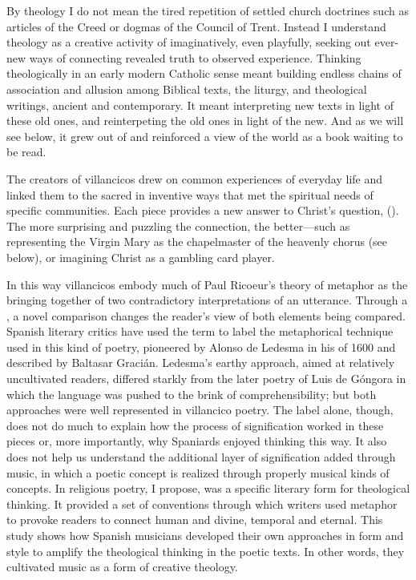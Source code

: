 By theology I do not mean the tired repetition of settled church doctrines such
as articles of the Creed or dogmas of the Council of Trent.
Instead I understand theology as a creative activity of imaginatively, even
playfully, seeking out ever-new ways of connecting revealed truth to observed
experience.
Thinking theologically in an early modern Catholic sense meant building 
endless chains of association and allusion among Biblical texts, the liturgy,
and theological writings, ancient and contemporary.
It meant interpreting new texts in light of these old ones, and reinterpeting
the old ones in light of the new.
And as we will see below, it grew out of and reinforced a view of the world as
a book waiting to be read.

The creators of villancicos drew on common experiences of everyday life and
linked them to the sacred in inventive ways that met the spiritual needs of
specific communities.
Each piece provides a new answer to Christ's question, 
().
The more surprising and puzzling the connection, the better---such as
representing the Virgin Mary as the chapelmaster of the heavenly chorus (see
below), or imagining Christ as a gambling card player.%
    \Autocite{Cashner:Cards}

In this way villancicos embody much of Paul Ricoeur's theory of metaphor as the
bringing together of two contradictory interpretations of an utterance.
Through a , a novel comparison changes the reader's
view of both elements being compared.%
    \Autocite{Ricoeur:InterpretationTheory}
Spanish literary critics have used the term  to label the
metaphorical technique used in this kind of poetry, pioneered by Alonso de
Ledesma in his  of 1600 and described by
Baltasar Gracián.%
   \Autocites
   {Gracian:Ingenio}
   [227--228]{Gaylord:Poetry}
   {Valbuena:Literatura}
   [447--448]{Torrente:VC-chapter}
Ledesma's earthy approach, aimed at relatively uncultivated readers, differed
starkly from the later poetry of Luis de Góngora in which the language was
pushed to the brink of comprehensibility; but both approaches were well
represented in villancico poetry.%
    \Autocites{Tenorio:Gongorismo}
The label  alone, though, does not do much to explain how the
process of signification worked in these pieces or, more importantly, why
Spaniards enjoyed thinking this way.
It also does not help us understand the additional layer of signification added
through music, in which a poetic concept is realized through properly musical
kinds of concepts.
In religious poetry, I propose,  was a specific literary form
for theological thinking.
It provided a set of conventions through which writers used metaphor to provoke
readers to connect human and divine, temporal and eternal.
This study shows how Spanish musicians developed their own approaches in form
and style to amplify the theological thinking in the poetic texts. 
In other words, they cultivated music as a form of creative theology.

